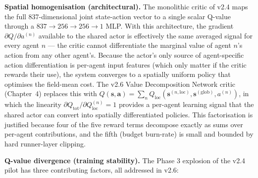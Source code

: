 \textbf{Spatial homogenisation (architectural).}
The monolithic critic of v2.4 maps the full 837-dimensional joint state-action
vector to a single scalar Q-value through a $837 \to 256 \to 256 \to 1$ MLP. With
this architecture, the gradient $\partial Q/\partial a^{(n)}$ available to the
shared actor is effectively the same averaged signal for every agent $n$ — the
critic cannot differentiate the marginal value of agent $n$'s action from any
other agent's. Because the actor's only source of agent-specific action
differentiation is per-agent input features (which only matter if the critic
rewards their use), the system converges to a spatially uniform policy that
optimises the field-mean cost. The v2.6 Value Decomposition Network critic
(Chapter~4) replaces this with $Q(\mathbf{s},\mathbf{a}) = \sum_n Q_{\mathrm{loc}}
(\mathbf{s}^{(n,\mathrm{loc})}, \mathbf{s}^{(\mathrm{glob})}, a^{(n)})$, in which
the linearity $\partial Q_{\mathrm{tot}}/\partial Q_{\mathrm{loc}}^{(n)} = 1$
provides a per-agent learning signal that the shared actor can convert into
spatially differentiated policies. This factorisation is justified because four
of the five reward terms decompose exactly as sums over per-agent contributions,
and the fifth (budget burn-rate) is small and bounded by hard runner-layer clipping.

\textbf{Q-value divergence (training stability).}
The Phase 3 explosion of the v2.4 pilot has three contributing factors, all
addressed in v2.6:

